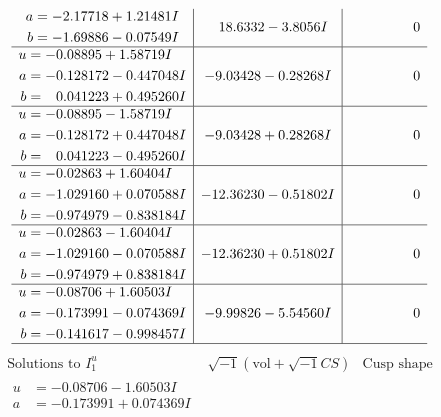 \documentclass[1p]{elsarticle_modified}
\theoremstyle{definition}
\newcommand{\I}{\sqrt{-1}}
\begin{document}
$$\begin{array}{c|c|c}
\begin{aligned}
a &= -2.17718 + 1.21481 I \\
b &= -1.69886 - 0.07549 I\end{aligned}
 & \phantom{-}18.6332 - 3.8056 I & \phantom{-0.000000 } 0 \\ \hline\begin{aligned}
u &= -0.08895 + 1.58719 I \\
a &= -0.128172 - 0.447048 I \\
b &= \phantom{-}0.041223 + 0.495260 I\end{aligned}
 & -9.03428 - 0.28268 I & \phantom{-0.000000 } 0 \\ \hline\begin{aligned}
u &= -0.08895 - 1.58719 I \\
a &= -0.128172 + 0.447048 I \\
b &= \phantom{-}0.041223 - 0.495260 I\end{aligned}
 & -9.03428 + 0.28268 I & \phantom{-0.000000 } 0 \\ \hline\begin{aligned}
u &= -0.02863 + 1.60404 I \\
a &= -1.029160 + 0.070588 I \\
b &= -0.974979 - 0.838184 I\end{aligned}
 & -12.36230 - 0.51802 I & \phantom{-0.000000 } 0 \\ \hline\begin{aligned}
u &= -0.02863 - 1.60404 I \\
a &= -1.029160 - 0.070588 I \\
b &= -0.974979 + 0.838184 I\end{aligned}
 & -12.36230 + 0.51802 I & \phantom{-0.000000 } 0 \\ \hline\begin{aligned}
u &= -0.08706 + 1.60503 I \\
a &= -0.173991 - 0.074369 I \\
b &= -0.141617 - 0.998457 I\end{aligned}
 & -9.99826 - 5.54560 I & \phantom{-0.000000 } 0\\
 \hline 
 \end{array}$$\newpage$$\begin{array}{c|c|c}  
\text{Solutions to }I^u_{1}& \I (\text{vol} + \sqrt{-1}CS) & \text{Cusp shape}\\
 \hline 
\begin{aligned}
u &= -0.08706 - 1.60503 I \\
a &= -0.173991 + 0.074369 I \\

\end{aligned}
\end{array}$$
\end{document}
